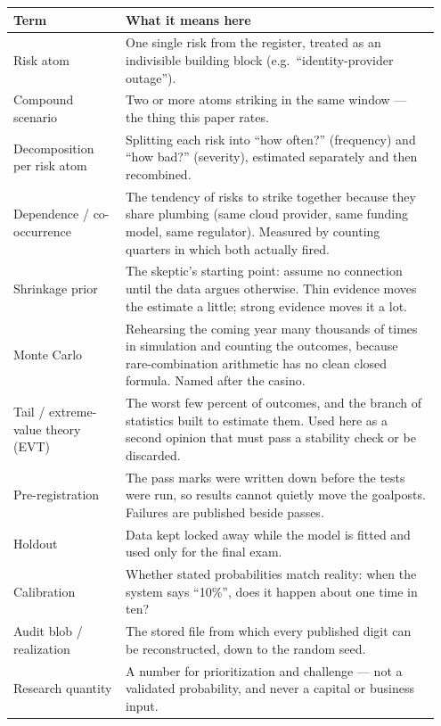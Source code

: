 \documentclass[11pt]{article}
\begin{document}
\begin{center}\footnotesize
\begin{tabular}{@{}p{0.25\linewidth}p{0.70\linewidth}@{}}
\toprule
Term & What it means here \\
\midrule
Risk atom & One single risk from the register, treated as an indivisible
building block (e.g.\ ``identity-provider outage''). \\
Compound scenario & Two or more atoms striking in the same window --- the
thing this paper rates. \\
Decomposition per risk atom & Splitting each risk into ``how often?''
(frequency) and ``how bad?'' (severity), estimated separately and then
recombined. \\
Dependence / co-occurrence & The tendency of risks to strike together
because they share plumbing (same cloud provider, same funding model, same
regulator). Measured by counting quarters in which both actually fired. \\
Shrinkage prior & The skeptic's starting point: assume no connection until
the data argues otherwise. Thin evidence moves the estimate a little;
strong evidence moves it a lot. \\
Monte Carlo & Rehearsing the coming year many thousands of times in
simulation and counting the outcomes, because rare-combination arithmetic
has no clean closed formula. Named after the casino. \\
Tail / extreme-value theory (EVT) & The worst few percent of outcomes, and
the branch of statistics built to estimate them. Used here as a second
opinion that must pass a stability check or be discarded. \\
Pre-registration & The pass marks were written down before the tests were
run, so results cannot quietly move the goalposts. Failures are published
beside passes. \\
Holdout & Data kept locked away while the model is fitted and used only
for the final exam. \\
Calibration & Whether stated probabilities match reality: when the system
says ``10\%'', does it happen about one time in ten? \\
Audit blob / realization & The stored file from which every published
digit can be reconstructed, down to the random seed. \\
Research quantity & A number for prioritization and challenge --- not a
validated probability, and never a capital or business input. \\
\bottomrule
\end{tabular}
\end{center}
\end{document}
